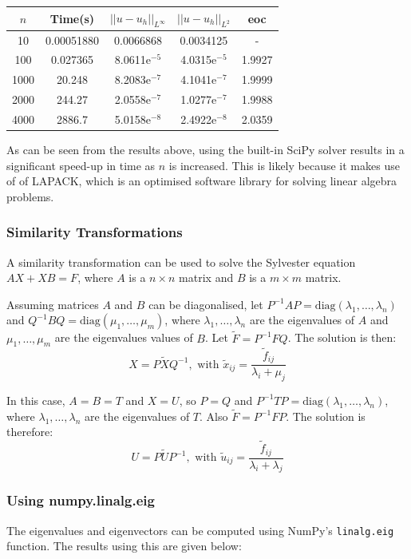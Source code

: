 \documentclass{article}
\numberwithin{equation}{section}
\begin{document}
\begin{table}[H]
\centering
\begin{tabular}{|c|c|c|c|c|}
\hline
$n$ & Time(s) & $|| u - u_h ||_{L^{\infty}}$ &$|| u - u_h ||_{L^{2}}$ & eoc \\
\hline
10 & 0.00051880 & 0.0066868 & 0.0034125 & -  \\
100 & 0.027365 & 8.0611e$^{-5}$ & 4.0315e$^{-5}$ & 1.9927  \\
1000 & 20.248 & 8.2083e$^{-7}$ & 4.1041e$^{-7}$ & 1.9999 \\
2000 & 244.27 & 2.0558e$^{-7}$ & 1.0277e$^{-7}$ & 1.9988  \\
4000 & 2886.7 & 5.0158e$^{-8}$ & 2.4922e$^{-8}$ & 2.0359 \\
\hline
\end{tabular}
\end{table}

As can be seen from the results above, using the built-in SciPy solver results in a significant speed-up in time as $n$ is increased. This is likely because it makes use of of LAPACK, which is an optimised software library for solving linear algebra problems.


\subsubsection{Similarity Transformations}
A similarity transformation \cite{Simoncini} can be used to solve the Sylvester equation $AX + XB = F$, where $A$ is a $n \times n$ matrix and $B$ is a $m \times m$ matrix. 

Assuming matrices $A$ and $B$ can be diagonalised, let $P^{-1}AP = \text{diag}(\lambda_1, \dots, \lambda_n)$ and $Q^{-1}BQ = \text{diag}(\mu_1, \dots, \mu_m)$, where $\lambda_1, \dots, \lambda_n$ are the eigenvalues of $A$ and $\mu_1, \dots, \mu_m$ are the eigenvalues values of $B$. Let $\tilde{F} = P^{-1}FQ$. The solution is then:
\[ X = P \tilde{X} Q^{-1}, \text{ with } \tilde{x}_{ij} = \frac{\tilde{f}_{ij}}{\lambda_i + \mu_j} \]

In this case, $A=B=T$ and $X=U$, so $P=Q$ and $P^{-1}TP = \text{diag}(\lambda_1, \dots, \lambda_n)$, where $\lambda_1, \dots, \lambda_n$ are the eigenvalues of $T$. Also $\tilde{F}=P^{-1}FP$. The solution is therefore:
\[ U = P \tilde{U} P^{-1}, \text{ with } \tilde{u}_{ij} = \frac{\tilde{f}_{ij}}{\lambda_i + \lambda_j} \]

\subsubsection*{Using numpy.linalg.eig}
The eigenvalues and eigenvectors can be computed using NumPy's \texttt{linalg.eig} function. The results using this are given below:
\end{document}
